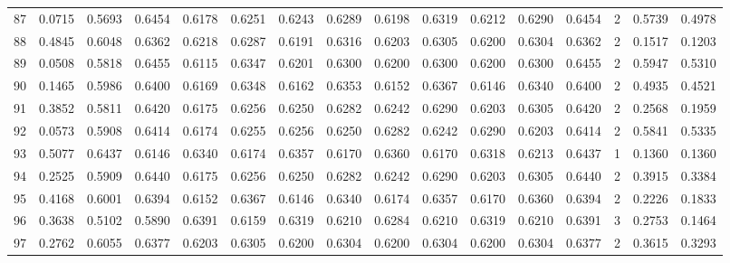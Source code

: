 \begin{tabular}{lrrrrrrrrrrrrrrr}
87  &      0.0715 &  0.5693 &  0.6454 &  0.6178 &  0.6251 &  0.6243 &  0.6289 &  0.6198 &  0.6319 &  0.6212 &   0.6290 &     0.6454 &      2 &                    0.5739 &                     0.4978 \\
88  &      0.4845 &  0.6048 &  0.6362 &  0.6218 &  0.6287 &  0.6191 &  0.6316 &  0.6203 &  0.6305 &  0.6200 &   0.6304 &     0.6362 &      2 &                    0.1517 &                     0.1203 \\
89  &      0.0508 &  0.5818 &  0.6455 &  0.6115 &  0.6347 &  0.6201 &  0.6300 &  0.6200 &  0.6300 &  0.6200 &   0.6300 &     0.6455 &      2 &                    0.5947 &                     0.5310 \\
90  &      0.1465 &  0.5986 &  0.6400 &  0.6169 &  0.6348 &  0.6162 &  0.6353 &  0.6152 &  0.6367 &  0.6146 &   0.6340 &     0.6400 &      2 &                    0.4935 &                     0.4521 \\
91  &      0.3852 &  0.5811 &  0.6420 &  0.6175 &  0.6256 &  0.6250 &  0.6282 &  0.6242 &  0.6290 &  0.6203 &   0.6305 &     0.6420 &      2 &                    0.2568 &                     0.1959 \\
92  &      0.0573 &  0.5908 &  0.6414 &  0.6174 &  0.6255 &  0.6256 &  0.6250 &  0.6282 &  0.6242 &  0.6290 &   0.6203 &     0.6414 &      2 &                    0.5841 &                     0.5335 \\
93  &      0.5077 &  0.6437 &  0.6146 &  0.6340 &  0.6174 &  0.6357 &  0.6170 &  0.6360 &  0.6170 &  0.6318 &   0.6213 &     0.6437 &      1 &                    0.1360 &                     0.1360 \\
94  &      0.2525 &  0.5909 &  0.6440 &  0.6175 &  0.6256 &  0.6250 &  0.6282 &  0.6242 &  0.6290 &  0.6203 &   0.6305 &     0.6440 &      2 &                    0.3915 &                     0.3384 \\
95  &      0.4168 &  0.6001 &  0.6394 &  0.6152 &  0.6367 &  0.6146 &  0.6340 &  0.6174 &  0.6357 &  0.6170 &   0.6360 &     0.6394 &      2 &                    0.2226 &                     0.1833 \\
96  &      0.3638 &  0.5102 &  0.5890 &  0.6391 &  0.6159 &  0.6319 &  0.6210 &  0.6284 &  0.6210 &  0.6319 &   0.6210 &     0.6391 &      3 &                    0.2753 &                     0.1464 \\
97  &      0.2762 &  0.6055 &  0.6377 &  0.6203 &  0.6305 &  0.6200 &  0.6304 &  0.6200 &  0.6304 &  0.6200 &   0.6304 &     0.6377 &      2 &                    0.3615 &                     0.3293 \\

\end{tabular}
